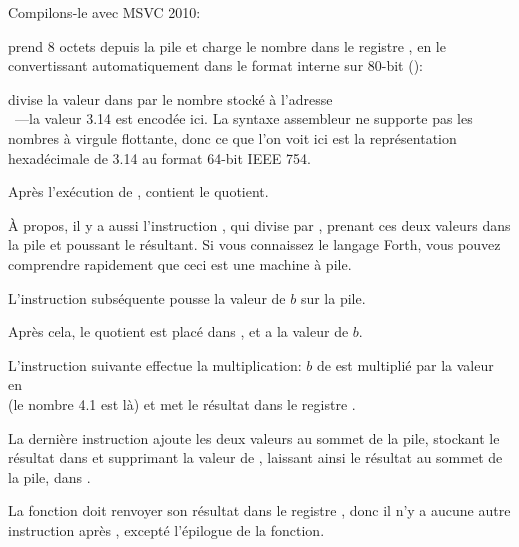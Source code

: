 
Compilons-le avec MSVC 2010:



\FLD prend 8 octets depuis la pile et charge le nombre dans le registre , en
le convertissant automatiquement dans le format interne sur 80-bit ():


\FDIV divise la valeur dans  par le nombre stocké à l'adresse \\
~---la valeur 3.14 est encodée ici.
La syntaxe assembleur ne supporte pas les nombres à virgule flottante, donc ce que
l'on voit ici est la représentation hexadécimale de 3.14 au format 64-bit IEEE 754.

Après l'exécution de \FDIV,  contient le \gls{quotient}.


À propos, il y a aussi l'instruction \FDIVP, qui divise  par , prenant
ces deux valeurs dans la pile et poussant le résultant.
Si vous connaissez le langage Forth\FNURLFORTH, vous pouvez comprendre rapidement
que ceci est une machine à pile\FNURLSTACK.

L'instruction \FLD subséquente pousse la valeur de $b$ sur la pile.

Après cela, le quotient est placé dans , et  a la valeur de $b$.


L'instruction suivante effectue la multiplication: $b$ de  est multiplié par
la valeur en\\
 (le nombre 4.1 est là) et met le résultat
dans le registre .


La dernière instruction \FADDP ajoute les deux valeurs au sommet de la pile, stockant
le résultat dans  et supprimant la valeur de , laissant ainsi le résultat
au sommet de la pile, dans .

La fonction doit renvoyer son résultat dans le registre , donc il n'y a aucune
autre instruction après \FADDP, excepté l'épilogue de la fonction.


